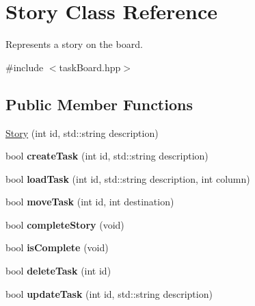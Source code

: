 \hypertarget{classStory}{\section{Story Class Reference}
\label{classStory}
}


Represents a story on the board.  




{\ttfamily \#include $<$task\-Board.\-hpp$>$}

\subsection*{Public Member Functions}
\begin{DoxyCompactItemize}
\item 
\hyperlink{classStory_ab222bafa7fbb82def385df8f35621c32}{Story} (int id, std\-::string description)
\item 
\hypertarget{classStory_a68096578fd7bb32088ef5bfa65ec100e}{bool {\bfseries create\-Task} (int id, std\-::string description)}\label{classStory_a68096578fd7bb32088ef5bfa65ec100e}

\item 
\hypertarget{classStory_a22003a9f2e8721483493326a3712b5c7}{bool {\bfseries load\-Task} (int id, std\-::string description, int column)}\label{classStory_a22003a9f2e8721483493326a3712b5c7}

\item 
\hypertarget{classStory_a072d6361d8a07ba58478a974f969035d}{bool {\bfseries move\-Task} (int id, int destination)}\label{classStory_a072d6361d8a07ba58478a974f969035d}

\item 
\hypertarget{classStory_a62b520195c67e1d198e134bc2c79b376}{bool {\bfseries complete\-Story} (void)}\label{classStory_a62b520195c67e1d198e134bc2c79b376}

\item 
\hypertarget{classStory_a21ff147f4f1ff5a8a8f9c346c0e4e84e}{bool {\bfseries is\-Complete} (void)}\label{classStory_a21ff147f4f1ff5a8a8f9c346c0e4e84e}

\item 
\hypertarget{classStory_ad482dc2ff43a8085ac16e9364435df70}{bool {\bfseries delete\-Task} (int id)}\label{classStory_ad482dc2ff43a8085ac16e9364435df70}

\item 
\hypertarget{classStory_a57d8f05b12e927e098b309274c7db77e}{bool {\bfseries update\-Task} (int id, std\-::string description)}\label{classStory_a57d8f05b12e927e098b309274c7db77e}


\end{DoxyCompactItemize}
